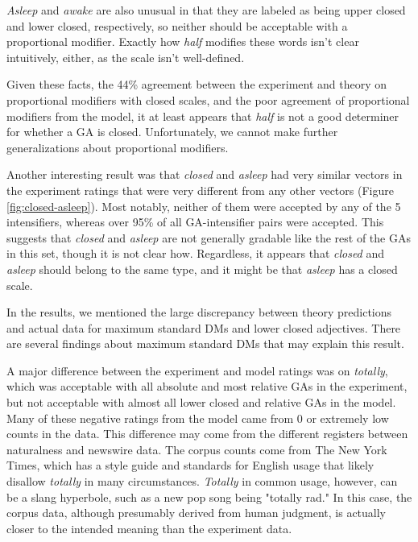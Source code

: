 \documentclass[11pt]{article}
\begin{document}
\textit{Asleep} and \textit{awake} are also unusual in that they are labeled as being upper closed and lower closed, respectively, so neither should be acceptable with a proportional modifier. Exactly how \textit{half} modifies these words isn't clear intuitively, either, as the scale isn't well-defined.

Given these facts, the 44\% agreement between the experiment and theory on proportional modifiers with closed scales, and the poor agreement of proportional modifiers from the model, it at least appears that \textit{half} is not a good determiner for whether a GA is closed. Unfortunately, we cannot make further generalizations about proportional modifiers. 

Another interesting result was that \textit{closed} and \textit{asleep} had very similar vectors in the experiment ratings that were very different from any other vectors (Figure \ref{fig:closed-asleep}). Most notably, neither of them were accepted by any of the 5 intensifiers, whereas over 95\% of all GA-intensifier pairs were accepted. This suggests that \textit{closed} and \textit{asleep} are not generally gradable like the rest of the GAs in this set, though it is not clear how. Regardless, it appears that \textit{closed} and \textit{asleep} should belong to the same type, and it might be that \textit{asleep} has a closed scale.

In the results, we mentioned the large discrepancy between theory predictions and actual data for maximum standard DMs and lower closed adjectives. There are several findings about maximum standard DMs that may explain this result.

A major difference between the experiment and model ratings was on \textit{totally}, which was acceptable with all absolute and most relative GAs in the experiment, but not acceptable with almost all lower closed and relative GAs in the model. Many of these negative ratings from the model came from 0 or extremely low counts in the data. This difference may come from the different registers between naturalness and newswire data. The corpus counts come from The New York Times, which has a style guide and standards for English usage that likely disallow \textit{totally} in many circumstances. \textit{Totally} in common usage, however, can be a slang hyperbole, such as a new pop song being "totally rad." In this case, the corpus data, although presumably derived from human judgment, is actually closer to the intended meaning than the experiment data.
\end{document}
